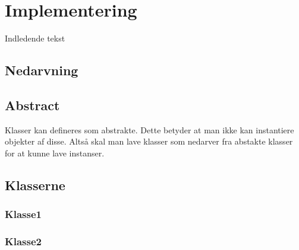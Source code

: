 \documentclass[../main.tex]{subfiles}
\begin{document}
\section{Implementering}

\flushleft
Indledende tekst

\subsection{Nedarvning}


\subsection{Abstract}
Klasser kan defineres som abstrakte. Dette betyder at man ikke kan instantiere objekter af disse. Altså skal man lave klasser som nedarver fra abstakte klasser for at kunne lave instanser.

\subsection{Klasserne}

\subsubsection{Klasse1}

\subsubsection{Klasse2}
\end{document}
